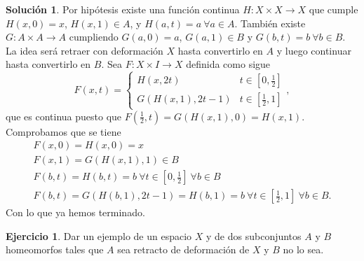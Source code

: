 \documentclass{article}
\theoremstyle{plain}
\theoremstyle{definition}
\newtheorem{exercise}{Ejercicio}
\newtheorem*{sol*}{Solución}
\begin{document}
\begin{sol*}
Por hipótesis existe una función continua $H:X\times X\to X$ que cumple $H(x,0)=x$, $H(x,1)\in A$, y $H(a,t)=a\ \forall a\in A$. También existe $G:A\times A\to A$ cumpliendo $G(a,0)=a$, $G(a,1)\in B$ y $G(b,t)=b\ \forall b\in B$. La idea será retraer con deformación $X$ hasta convertirlo en $A$ y luego continuar hasta convertirlo en $B$. Sea $F:X\times I\to X$ definida como sigue
\[
F(x,t)=\begin{cases}
H(x,2t) & t\in[0,\frac{1}{2}]\\
G(H(x,1),2t-1) & t\in[\frac{1}{2},1]
\end{cases},
\]
que es continua puesto que $F(\frac{1}{2},t)=G(H(x,1),0)=H(x,1)$. Comprobamos que se tiene
\begin{gather*}
F(x,0)=H(x,0)=x\\
F(x,1)=G(H(x,1),1)\in B\\
F(b,t)=H(b,t)=b\ \forall t\in [0,\frac{1}{2}]\ \forall b\in B\\
F(b,t)=G(H(b,1),2t-1)=H(b,1)=b\ \forall t\in[\frac{1}{2},1] \ \forall b\in B.
\end{gather*}
Con lo que ya hemos terminado. 
\end{sol*}
\newpage
\begin{exercise}Dar un ejemplo de un espacio $X$ y de dos subconjuntos $A$ y $B$ homeomorfos tales que $A$ sea retracto de deformación de $X$ y $B$ no lo sea.
\end{exercise}
\end{document}
